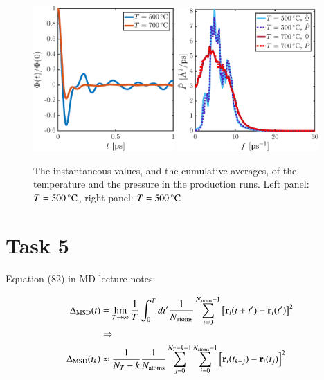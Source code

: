 \begin{figure}[!ht]
\begin{center}
  \includegraphics[width=0.48\textwidth]{../figures/Phi-t} 
    \includegraphics[width=0.48\textwidth]{../figures/P-freq} 
  \caption{The instantaneous values, and the cumulative averages, of the temperature and the pressure in the production runs. Left panel: $T=\unit[500]{^\circ C}$,  right panel: $T=\unit[500]{^\circ C}$}
  \label{fig:prod}
\end{center}
\end{figure}


\section*{Task 5}
Equation (82) in MD lecture notes:


\begin{align}
\Delta_{\rm MSD}(t) &= \lim_{T \rightarrow \infty} \frac{1}{T} \int_0^{T} d t' \frac{1}{N_{\rm atoms}} \sum_{i=0}^{N_{\rm atoms}-1} \left[{\bf r}_i(t+t') - {\bf r}_i(t') \right]^2 \\ &\Rightarrow \nonumber
\\
\Delta_{\rm MSD}(t_k) &\approx
\frac{1}{N_T -k}\frac{1}{N_{\rm atoms}} \sum_{j=0}^{N_T-k-1} \sum_{i=0}^{N_{\rm atoms}-1} \left[{\bf r}_i(t_{k+j}) - {\bf r}_i(t_j) \right]^2 
\end{align}

